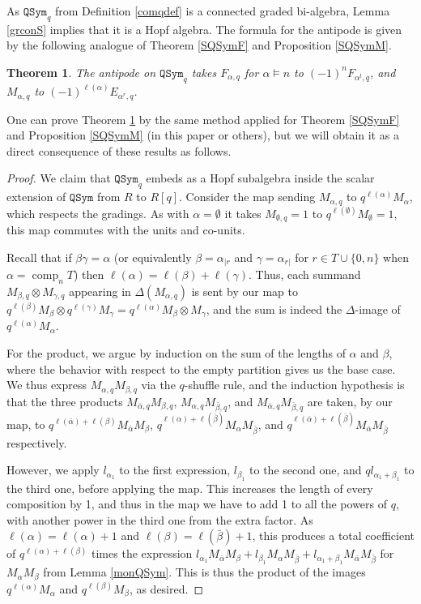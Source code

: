 \documentclass{article}
\newtheorem{thm}{Theorem}[section]
\theoremstyle{definition}
\begin{document}
As $\mathtt{QSym}_{q}$ from Definition \ref{comqdef} is a connected graded bi-algebra, Lemma \ref{grconS} implies that it is a Hopf algebra. The formula for the antipode is given by the following analogue of Theorem \ref{SQSymF} and Proposition \ref{SQSymM}.
\begin{thm}
The antipode on $\mathtt{QSym}_{q}$ takes $F_{\alpha,q}$ for $\alpha \vDash n$ to $(-1)^{n}F_{\alpha^{t},q}$, and $M_{\alpha,q}$ to $(-1)^{\ell(\alpha)}E_{\alpha^{r},q}$. \label{SqQSym}
\end{thm}
One can prove Theorem \ref{SqQSym} by the same method applied for Theorem \ref{SQSymF} and Proposition \ref{SQSymM} (in this paper or others), but we will obtain it as a direct consequence of these results as follows.
\begin{proof}
We claim that $\mathtt{QSym}_{q}$ embeds as a Hopf subalgebra inside the scalar extension of $\mathtt{QSym}$ from $R$ to $R[q]$. Consider the map sending $M_{\alpha,q}$ to $q^{\ell(\alpha)}M_{\alpha}$, which respects the gradings. As with $\alpha=\emptyset$ it takes $M_{\emptyset,q}=1$ to $q^{\ell(\emptyset)}M_{\emptyset}=1$, this map commutes with the units and co-units.

Recall that if $\beta\gamma=\alpha$ (or equivalently $\beta=\alpha_{|r}$ and $\gamma=\alpha_{r|}$ for $r \in T\cup\{0,n\}$ when $\alpha=\operatorname{comp}_{n}T$) then $\ell(\alpha)=\ell(\beta)+\ell(\gamma)$. Thus, each summand $M_{\beta,q} \otimes M_{\gamma,q}$ appearing in $\Delta(M_{\alpha,q})$ is sent by our map to $q^{\ell(\beta)}M_{\beta} \otimes q^{\ell(\gamma)}M_{\gamma}=q^{\ell(\alpha)}M_{\beta} \otimes M_{\gamma}$, and the sum is indeed the $\Delta$-image of $q^{\ell(\alpha)}M_{\alpha}$.

For the product, we argue by induction on the sum of the lengths of $\alpha$ and $\beta$, where the behavior with respect to the empty partition gives us the base case. We thus express $M_{\alpha,q}M_{\beta,q}$ via the $q$-shuffle rule, and the induction hypothesis is that the three products $M_{\bar{\alpha},q}M_{\beta,q}$, $M_{\alpha,q}M_{\bar{\beta},q}$, and $M_{\bar{\alpha},q}M_{\bar{\beta},q}$ are taken, by our map, to $q^{\ell(\bar{\alpha})+\ell(\beta)}M_{\bar{\alpha}}M_{\beta}$, $q^{\ell(\alpha)+\ell(\bar{\beta})}M_{\alpha}M_{\bar{\beta}}$, and $q^{\ell(\bar{\alpha})+\ell(\bar{\beta})}M_{\bar{\alpha}}M_{\bar{\beta}}$ respectively.

However, we apply $l_{\alpha_{1}}$ to the first expression, $l_{\beta_{1}}$ to the second one, and $ql_{\alpha_{1}+\beta_{1}}$ to the third one, before applying the map. This increases the length of every composition by 1, and thus in the map we have to add 1 to all the powers of $q$, with another power in the third one from the extra factor. As $\ell(\alpha)=\ell(\alpha)+1$ and $\ell(\beta)=\ell(\bar{\beta})+1$, this produces a total coefficient of $q^{\ell(\alpha)+\ell(\beta)}$ times the expression $l_{\alpha_{1}}M_{\bar{\alpha}}M_{\beta}+l_{\beta_{1}}M_{\alpha}M_{\bar{\beta}}+l_{\alpha_{1}+\beta_{1}}M_{\bar{\alpha}}M_{\bar{\beta}}$ for $M_{\alpha}M_{\beta}$ from Lemma \ref{monQSym}. This is thus the product of the images $q^{\ell(\alpha)}M_{\alpha}$ and $q^{\ell(\beta)}M_{\beta}$, as desired.


\end{proof}
\end{document}
